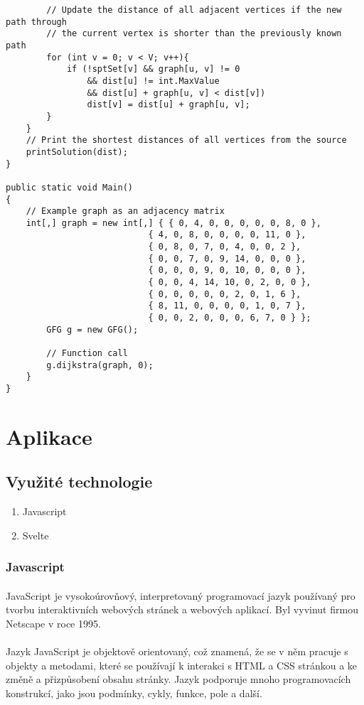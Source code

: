 \documentclass[12pt, titlepage, a4paper]{article}
\begin{document}
\begin{lstlisting}
        // Update the distance of all adjacent vertices if the new path through
        // the current vertex is shorter than the previously known path
        for (int v = 0; v < V; v++){
            if (!sptSet[v] && graph[u, v] != 0
                && dist[u] != int.MaxValue
                && dist[u] + graph[u, v] < dist[v])
                dist[v] = dist[u] + graph[u, v];
        }
    }
    // Print the shortest distances of all vertices from the source
    printSolution(dist);
}

public static void Main()
{
    // Example graph as an adjacency matrix
    int[,] graph = new int[,] { { 0, 4, 0, 0, 0, 0, 0, 8, 0 },
                            { 4, 0, 8, 0, 0, 0, 0, 11, 0 },
                            { 0, 8, 0, 7, 0, 4, 0, 0, 2 },
                            { 0, 0, 7, 0, 9, 14, 0, 0, 0 },
                            { 0, 0, 0, 9, 0, 10, 0, 0, 0 },
                            { 0, 0, 4, 14, 10, 0, 2, 0, 0 },
                            { 0, 0, 0, 0, 0, 2, 0, 1, 6 },
                            { 8, 11, 0, 0, 0, 0, 1, 0, 7 },
                            { 0, 0, 2, 0, 0, 0, 6, 7, 0 } };
        GFG g = new GFG();
 
        // Function call
        g.dijkstra(graph, 0);
    }
}
\end{lstlisting}
\section{Aplikace}
\subsection{Využité technologie}
\begin{enumerate}
    \item Javascript
    \item Svelte
\end{enumerate}
\subsubsection{Javascript}
\paragraph{}
JavaScript je vysokoúrovňový, interpretovaný programovací jazyk používaný pro tvorbu interaktivních 
webových stránek a webových aplikací. Byl vyvinut firmou Netscape v roce 1995.
\paragraph{}
Jazyk JavaScript je objektově orientovaný, což znamená, že se v něm pracuje s objekty a metodami, 
které se používají k interakci s HTML a CSS stránkou a ke změně a přizpůsobení obsahu stránky. 
Jazyk podporuje mnoho programovacích konstrukcí, jako jsou podmínky, cykly, funkce, pole a další.
\end{document}

